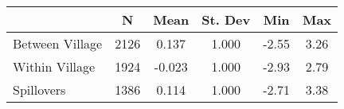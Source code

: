 \begin{tabular}{l*{5}{c}}\hline&\multicolumn{1}{c}{N}&\multicolumn{1}{c}{Mean}&\multicolumn{1}{c}{St. Dev}&\multicolumn{1}{c}{Min}&\multicolumn{1}{c}{Max}\\ \hline 
Between Village & 2126 & 0.137 & 1.000 & -2.55 & 3.26 \\
Within Village & 1924 & -0.023 & 1.000 & -2.93 & 2.79 \\
Spillovers & 1386 & 0.114 & 1.000 & -2.71 & 3.38 \\
\hline \end{tabular}
